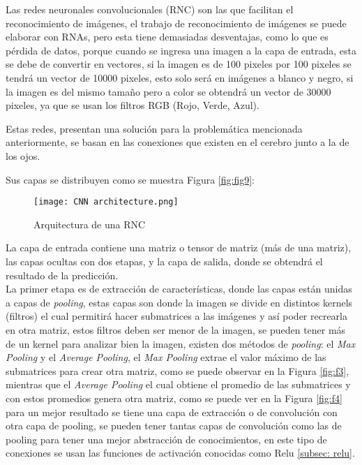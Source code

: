         	
            Las redes neuronales convolucionales (RNC) son las que facilitan el reconocimiento de imágenes, el trabajo de reconocimiento de
            imágenes se puede elaborar con RNAs, pero esta tiene demasiadas desventajas, como lo que es p\'erdida de datos, porque cuando se 
            ingresa una imagen a la capa de entrada, esta se debe de convertir en vectores, si la imagen es de 100 pixeles por 100 pixeles
            se tendrá un vector de 10000 pixeles, esto solo ser\'a en imágenes a blanco y negro, si la imagen es del mismo tamaño pero a color
            se obtendrá un vector de 30000 pixeles, ya que se usan los filtros RGB (Rojo, Verde, Azul).

            Estas redes, presentan una soluci\'on para la problemática mencionada anteriormente, se basan en las conexiones que existen en 
            el cerebro junto a la de los ojos.

            Sus capas se distribuyen como se muestra Figura \eqref{fig:fig9}:
            
            
            \begin{figure}[H]
                \centering
                \texttt{[image: CNN architecture.png]}
                \caption{Arquitectura de una RNC \cite{Ortiz2020}}
                \label{fig:fig9}
            \end{figure}

            La capa de entrada contiene una matriz o tensor de matriz (m\'as de una matriz), las capas ocultas con dos etapas, y la 
            capa de salida, donde se obtendrá el resultado de la predicci\'on. \\
            
            La primer etapa es de extracci\'on de características, donde las capas están unidas a capas de \textit{pooling}, estas capas son 
            donde la imagen se divide en distintos kernels (filtros) el cual permitirá hacer submatrices a las imágenes y así poder recrearla
            en otra matriz, estos filtros deben ser menor de la imagen, se pueden tener m\'as de un kernel para
            analizar bien la imagen, existen dos m\'etodos de \textit{pooling}: el \textit{Max Pooling} y el \textit{Average Pooling},
             el \textit{Max Pooling} extrae el valor m\'aximo de las submatrices para crear otra matriz, como se puede observar en la 
            Figura \eqref{fig:f3}, mientras que el \textit{Average Pooling} el cual obtiene el promedio de las submatrices y con 
            estos promedios genera otra matriz, como se puede ver en la Figura \eqref{fig:f4} para un mejor resultado se tiene una capa de extracci\'on 
            o de convoluci\'on con otra capa de pooling, se pueden tener tantas capas de convoluci\'on como las de pooling 
            para tener una mejor abstracci\'on de conocimientos, en este tipo de conexiones se usan las funciones de activaci\'on conocidas como Relu \eqref{subsec: relu}. 

